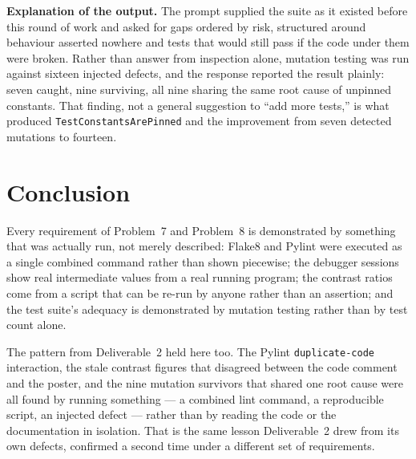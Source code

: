 \documentclass[11pt,a4paper]{article}
\begin{document}
\noindent\textbf{Explanation of the output.} The prompt supplied the
suite as it existed before this round of work and asked for gaps
ordered by risk, structured around behaviour asserted nowhere and
tests that would still pass if the code under them were broken.
Rather than answer from inspection alone, mutation testing was run
against sixteen injected defects, and the response reported the
result plainly: seven caught, nine surviving, all nine sharing the
same root cause of unpinned constants. That finding, not a general
suggestion to ``add more tests,'' is what produced
\texttt{TestConstantsArePinned} and the improvement from seven
detected mutations to fourteen.

\newpage
\section{Conclusion}

Every requirement of Problem~7 and Problem~8 is demonstrated by
something that was actually run, not merely described: Flake8 and
Pylint were executed as a single combined command rather than shown
piecewise; the debugger sessions show real intermediate values from
a real running program; the contrast ratios come from a script that
can be re-run by anyone rather than an assertion; and the test suite's
adequacy is demonstrated by mutation testing rather than by test
count alone.

The pattern from Deliverable~2 held here too. The Pylint
\texttt{duplicate-code} interaction, the stale contrast figures that
disagreed between the code comment and the poster, and the nine
mutation survivors that shared one root cause were all found by
running something --- a combined lint command, a reproducible script,
an injected defect --- rather than by reading the code or the
documentation in isolation. That is the same lesson Deliverable~2
drew from its own defects, confirmed a second time under a different
set of requirements.
\end{document}
